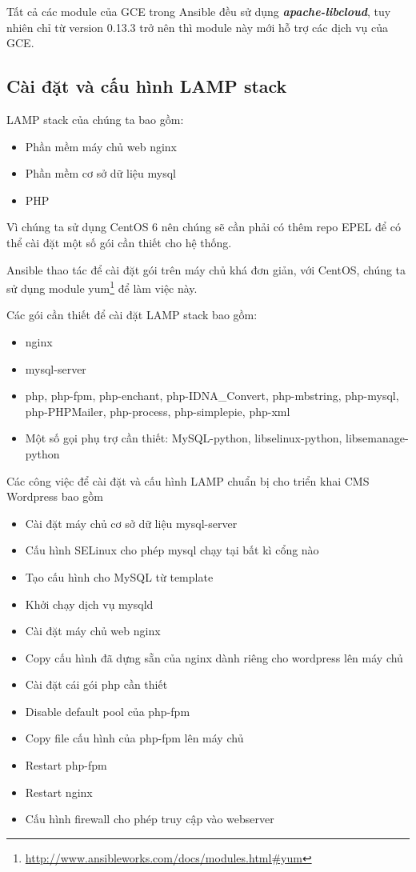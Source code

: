 Tất cả các module của GCE trong Ansible đều sử dụng \textbf{\textit{apache-libcloud}}, tuy nhiên chỉ từ version 0.13.3 trở nên thì module này mới hỗ trợ các dịch vụ của GCE.

\subsection{Cài đặt và cấu hình LAMP stack}

LAMP stack của chúng ta bao gồm:

\begin{itemize}
\item Phần mềm máy chủ web nginx
\item Phần mềm cơ sở dữ liệu mysql
\item PHP
\end{itemize}

Vì chúng ta sử dụng CentOS 6 nên chúng sẽ cần phải có thêm repo EPEL để có thể cài đặt một số gói cần thiết cho hệ thống.

Ansible thao tác để cài đặt gói trên máy chủ khá đơn giản, với CentOS, chúng ta sử dụng module yum\footnote{\url{http://www.ansibleworks.com/docs/modules.html\#yum}} để làm việc này.

Các gói cần thiết để cài đặt LAMP stack bao gồm:

\begin{itemize}
\item nginx
\item mysql-server
\item php, php-fpm, php-enchant, php-IDNA\_Convert, php-mbstring, php-mysql, php-PHPMailer, php-process, php-simplepie, php-xml
\item Một số gọi phụ trợ cần thiết: MySQL-python, libselinux-python, libsemanage-python
\end{itemize}

Các công việc để cài đặt và cấu hình LAMP chuẩn bị cho triển khai CMS Wordpress bao gồm

\begin{itemize}
\item Cài đặt máy chủ cơ sở dữ liệu mysql-server
\item Cấu hình SELinux cho phép mysql chạy tại bất kì cổng nào
\item Tạo cấu hình cho MySQL từ template
\item Khởi chạy dịch vụ mysqld
\item Cài đặt máy chủ web nginx
\item Copy cấu hình đã dựng sẵn của nginx dành riêng cho wordpress lên máy chủ
\item Cài đặt cái gói php cần thiết
\item Disable default pool của php-fpm
\item Copy file cấu hình của php-fpm lên máy chủ
\item Restart php-fpm
\item Restart nginx
\item Cấu hình firewall cho phép truy cập vào webserver
\end{itemize}

